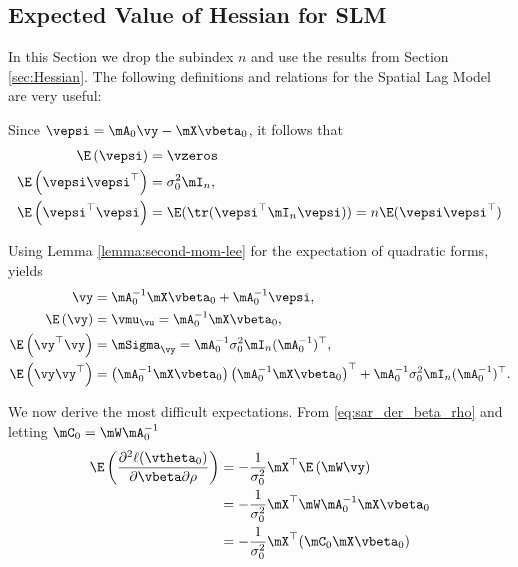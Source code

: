 \documentclass[english,12pt]{book}\usepackage[]{graphicx}\usepackage[]{xcolor}
\begin{document}
\begin{subappendices}
 \section{Expected Value of Hessian for SLM}\label{appendix-EH-sml}

In this Section we drop the subindex $n$ and use the results from Section \ref{sec:Hessian}. The following definitions and relations for the Spatial Lag Model are very useful:

Since $\vepsi  =  \mA_0\vy - \mX\vbeta_0$, it follows that
\begin{align*}
	\E\left(\vepsi\right)      & = \vzeros \\
	\E\left(\vepsi\vepsi^\top\right) &= \sigma^2_0\mI_n, \\
	\E\left(\vepsi^\top\vepsi\right) &= \E(\tr(\vepsi^\top\mI_n\vepsi)) = n\E(\vepsi\vepsi^\top)
\end{align*}

Using Lemma \ref{lemma:second-mom-lee} for the expectation of quadratic forms, yields
\begin{equation}
\begin{aligned}
	\vy & =  \mA_0^{-1}\mX\vbeta_0 + \mA_0^{-1}\vepsi, \\
	\E\left(\vy\right)   & = \vmu_{\vu} = \mA_0^{-1}\mX\vbeta_0, \\
	\E\left(\vy^\top\vy\right) & = \mSigma_{\vy} = \mA_0^{-1}\sigma^2_0\mI_n(\mA_0^{-1})^\top, \\
	\E\left(\vy\vy^\top\right) & = \left(\mA_0^{-1}\mX\vbeta_0\right) \left(\mA_0^{-1}\mX\vbeta_0\right)^\top + \mA_0^{-1}\sigma^2_0\mI_n(\mA_0^{-1})^\top.
\end{aligned}
\end{equation}

We now derive the most difficult expectations. From \eqref{eq:sar_der_beta_rho} and letting $\mC_0 = \mW\mA^{-1}_0$
\begin{equation}\label{eq:E_der_beta_rho}
\begin{aligned}
\E\left(\frac{\partial^2  \ell(\vtheta_0)}{\partial \vbeta \partial \rho}\right) & = - \frac{1}{\sigma^2_0} \mX^\top\E\left(\mW\vy\right) \\
& = - \frac{1}{\sigma^2_0} \mX^\top\mW\mA^{-1}_0\mX\vbeta_0 \\
& = - \frac{1}{\sigma^2_0} \mX^\top(\mC_0\mX\vbeta_0)
\end{aligned}	
\end{equation}


\end{subappendices}
\end{document}
